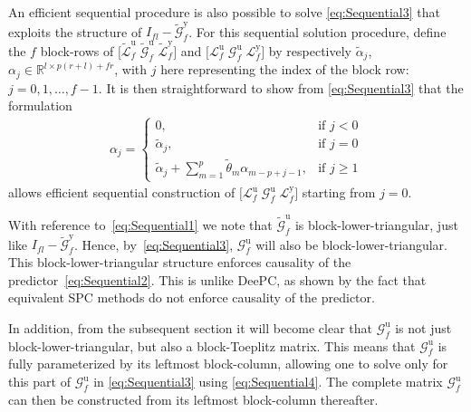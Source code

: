 An efficient sequential procedure is also possible to solve \eqref{eq:Sequential3} that exploits the structure of ${I_{fl}-\widetilde{\mathcal{G}}^\mathrm{y}_f}$. For this sequential solution procedure, define the $f$ block-rows of $\big[\widetilde{\mathcal{L}}^\mathrm{u}_f \; \widetilde{\mathcal{G}}^\mathrm{u}_f \; \widetilde{\mathcal{L}}^\mathrm{y}_f\big]$ and $\big[\mathcal{L}^\mathrm{u}_f \; \mathcal{G}^\mathrm{u}_f \; \mathcal{L}^\mathrm{y}_f\big]$ by respectively $\tilde{\alpha}_j$, ${\alpha_j\in\mathbb{R}^{l\times p(r+l)+fr}}$, with $j$ here representing the index of the block row: $j=0,1,\dots,f-1$. It is then straightforward to show from \eqref{eq:Sequential3} that the formulation
\begin{align}\label{eq:Sequential4}
    \alpha_j=
    \left\{\begin{array}{ll}
    0          ,     & \text{if } j<0 \\
    \tilde{\alpha}_j,& \text{if } j=0 \\
    \tilde{\alpha}_j + \sum\limits_{m=1}^{p}\tilde{\theta}_m\alpha_{m-p+j-1}, & \text{if } j \geq 1
    \end{array}\right.
\end{align}
 allows efficient sequential construction of $\big[\mathcal{L}^\mathrm{u}_f \; \mathcal{G}^\mathrm{u}_f \; \mathcal{L}^\mathrm{y}_f\big]$ starting from $j=0$. 
 
 With reference to~\eqref{eq:Sequential1} we note that $\widetilde{\mathcal{G}}^\mathrm{u}_f$ is block-lower-triangular, just like ${I_{fl}-\widetilde{\mathcal{G}}^\mathrm{y}_f}$. Hence, by~\eqref{eq:Sequential3}, $\mathcal{G}^\mathrm{u}_f$ will also be block-lower-triangular. This block-lower-triangular structure enforces causality of the predictor~\eqref{eq:Sequential2}. This is unlike \ac{DeePC}, as shown by the fact that equivalent \ac{SPC} methods do not enforce causality of the predictor.

 In addition, from the subsequent section it will become clear that $\mathcal{G}^\mathrm{u}_f$ is not just block-lower-triangular, but also a block-Toeplitz matrix. This means that $\mathcal{G}^\mathrm{u}_f$ is fully parameterized by its leftmost block-column, allowing one to solve only for this part of $\mathcal{G}^\mathrm{u}_f$ in \eqref{eq:Sequential3} using \eqref{eq:Sequential4}. The complete matrix $\mathcal{G}^\mathrm{u}_f$ can then be constructed from its leftmost block-column thereafter.